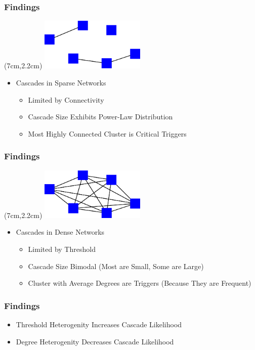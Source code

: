\documentclass[slidestop,usenames,dvipsnames]{beamer}
\newcommand{\fitem}{\pause\vfill\item}
\newcommand{\gitem}{\vfill\item}
\begin{document}
\begin{frame}
    \frametitle{Findings}
    \begin{textblock*}{5cm}(7cm,2.2cm)
        \includegraphics[width=5cm]{img/sparse}
    \end{textblock*}
    \begin{itemize}
        \gitem Cascades in Sparse Networks
        \begin{itemize}
          \fitem Limited by Connectivity
          \fitem Cascade Size Exhibits Power-Law Distribution
          \fitem Most Highly Connected Cluster is Critical Triggers
        \end{itemize}
    \end{itemize}
    \vfill
\end{frame}

\begin{frame}
    \frametitle{Findings}
    \begin{textblock*}{5cm}(7cm,2.2cm)
        \includegraphics[width=5cm]{img/dense}
    \end{textblock*}
    \begin{itemize}
        \gitem Cascades in Dense Networks
        \begin{itemize}
            \fitem Limited by Threshold
            \fitem Cascade Size Bimodal (Most are Small, Some are Large)
            \fitem Cluster with Average Degrees are Triggers (Because They are Frequent)
        \end{itemize}
    \end{itemize}
    \vfill
\end{frame}

\begin{frame}
  \frametitle{Findings}
  \begin{itemize}
    \fitem Threshold Heterogenity Increases Cascade Likelihood
    \fitem Degree Heterogenity Decreases Cascade Likelihood
  \end{itemize}
  \vfill
\end{frame}
\end{document}
